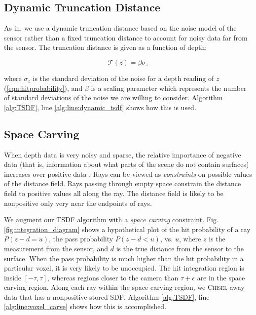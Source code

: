 \documentclass[conference]{IEEEtran}
\newcommand{\eref}[1]{(\ref{#1})}
\newcommand{\figref}[1]{Fig.\ref{#1}}
\newcommand{\TSDF}{TSDF\xspace}
\newcommand{\chisel}{\textsc{Chisel}\xspace}
\begin{document}
\subsection{Dynamic Truncation Distance}
\label{section:dynamic_trunc}
As in\cite{Nguyen2012, NiessnerHashing}, we use a dynamic truncation distance based on the
noise model of the sensor rather than a fixed truncation distance to account for
noisy data far from the sensor. The truncation distance is given as a function
of depth:

\begin{equation} \mathcal{T} (z) = \beta\sigma_{z} \end{equation}

\noindent where $\sigma_{z}$ is the standard deviation of the noise for a depth
reading of $z$ \eref{eqn:hitprobability}, and $\beta$ is a scaling
parameter which represents the number of standard deviations of the noise we
are willing to consider. Algorithm \ref{alg:TSDF}, line
\ref{alg:line:dynamic_tsdf} shows how this is used.
% 

\subsection{Space Carving}
\label{section:carving}
When depth data is very noisy and sparse, the relative importance of negative
data (that is, information about what parts of the scene do not contain
surfaces) increases over positive data \cite{Elfes1989, Klingensmith2014}. Rays
can be viewed as \textit{constraints} on possible values of the distance field.  Rays
passing through empty space constrain the distance field to positive values all
along the ray. The distance field is likely to be nonpositive only very near the
endpoints of rays.

We augment our \TSDF algorithm with a \textit{space carving}
\cite{Elfes1989} constraint.   \figref{fig:integration_diagram} shows a hypothetical
plot of the hit probability of a ray $P\left(z - d = u \right) $, the pass probability
$P\left(z - d < u\right)$, vs. $u$, where $z$ is the measurement from the
sensor, and $d$ is the true distance from the sensor to the surface. When the
pass probability is much higher than the hit probability in a particular voxel,
it is very likely to be unoccupied. The hit integration region is inside
$[-\tau, \tau]$, whereas regions closer to the camera than  $\tau + \epsilon$
are in the space carving region. Along each ray within the space carving region,
we \chisel away data that has a nonpositive stored SDF. Algorithm
\ref{alg:TSDF}, line \ref{alg:line:voxel_carve} shows how this is
accomplished.
\end{document}
